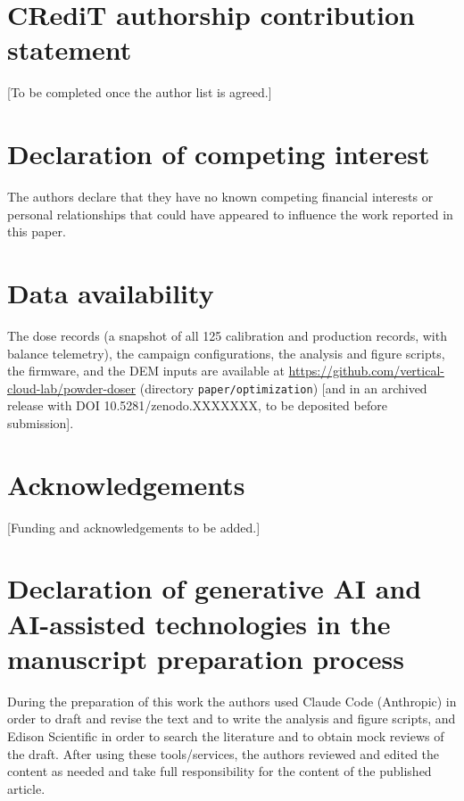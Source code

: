 \documentclass[preprint,12pt]{elsarticle}
\newcommand{\ph}[1]{\textcolor{orange!75!black}{\textsf{[#1]}}}
\begin{document}
\section*{CRediT authorship contribution statement}
\ph{To be completed once the author list is agreed.}

\section*{Declaration of competing interest}
The authors declare that they have no known competing financial interests or personal relationships that could have appeared to influence the work reported in this paper.

\section*{Data availability}
The dose records (a snapshot of all 125 calibration and production records, with balance telemetry), the campaign configurations, the analysis and figure scripts, the firmware, and the DEM inputs are available at \url{https://github.com/vertical-cloud-lab/powder-doser} (directory \texttt{paper/optimization}) \ph{and in an archived release with DOI 10.5281/zenodo.XXXXXXX, to be deposited before submission}.

\section*{Acknowledgements}
\ph{Funding and acknowledgements to be added.}

\section*{Declaration of generative AI and AI-assisted technologies in the manuscript preparation process}
During the preparation of this work the authors used Claude Code (Anthropic) in order to draft and revise the text and to write the analysis and figure scripts, and Edison Scientific in order to search the literature and to obtain mock reviews of the draft. After using these tools/services, the authors reviewed and edited the content as needed and take full responsibility for the content of the published article.



\end{document}

